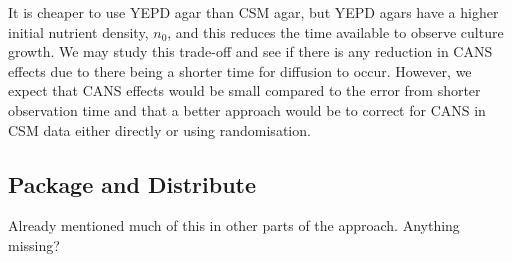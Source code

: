 It is cheaper to use YEPD agar than CSM agar, but YEPD agars have a
higher initial nutrient density, \(n_{0}\), and this reduces the time
available to observe culture growth. We may study this trade-off and
see if there is any reduction in CANS effects due to there being a
shorter time for diffusion to occur. However, we expect that CANS
effects would be small compared to the error from shorter observation
time and that a better approach would be to correct for CANS in CSM
data either directly or using randomisation.


\subsection{Package and Distribute}
\label{sec:package-distribute}
Already mentioned much of this in other parts of the
approach. Anything missing?

